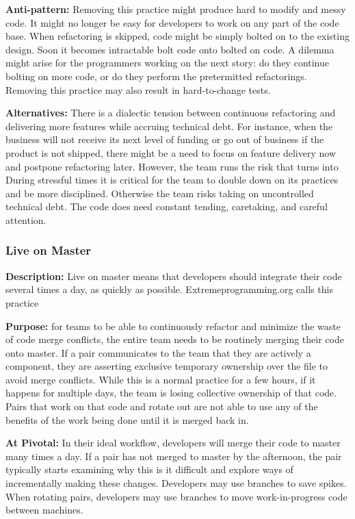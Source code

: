\begin{table}[]
\textbf{Anti-pattern:} Removing this practice might produce hard to modify and messy code. It might no longer be easy for developers to work on any part of the code base. When refactoring is skipped, code might be simply bolted on to the existing design. Soon it becomes intractable bolt code onto bolted on code. A dilemma might arise for the programmers working on the next story: do they continue bolting on more code, or do they perform the pretermitted refactorings. Removing this practice may also result in hard-to-change tests.

\textbf{Alternatives:} There is a dialectic tension \cite{RalphProcessTheories} between continuous refactoring and delivering more features while accruing technical debt. For instance, when the business will not receive its next level of funding or go out of business if the product is not shipped, there might be a need to focus on feature delivery now and postpone refactoring later. However, the team runs the risk that  turns into  During stressful times it is critical for the team to double down on its practices and be more disciplined. Otherwise the team risks taking on uncontrolled technical debt. The code does need constant tending, caretaking, and careful attention.

\subsubsection{Live on Master}
\textbf{Description:} Live on master means that developers should integrate their code several times a day, as quickly as possible. Extremeprogramming.org calls this practice  \cite{IntegrateOften} 

\textbf{Purpose:} for teams to be able to continuously refactor and minimize the waste of code merge conflicts, the entire team needs to be routinely merging their code onto master.  If a pair communicates to the team that they are actively  a component, they are asserting exclusive temporary ownership over the file to avoid merge conflicts. While this is a normal practice for a few hours, if it happens for multiple days, the team is losing collective ownership of that code. Pairs that work on that code and rotate out are not able to use any of the benefits of the work being done until it is merged back in. 

\textbf{At Pivotal:} In their ideal workflow, developers will merge their code to master many times a day. If a pair has not merged to master by the afternoon, the pair typically starts examining why this is it difficult and explore ways of incrementally making these changes. Developers may use branches to save spikes. When rotating pairs, developers may use branches to move work-in-progress code between machines.  


\end{table}
